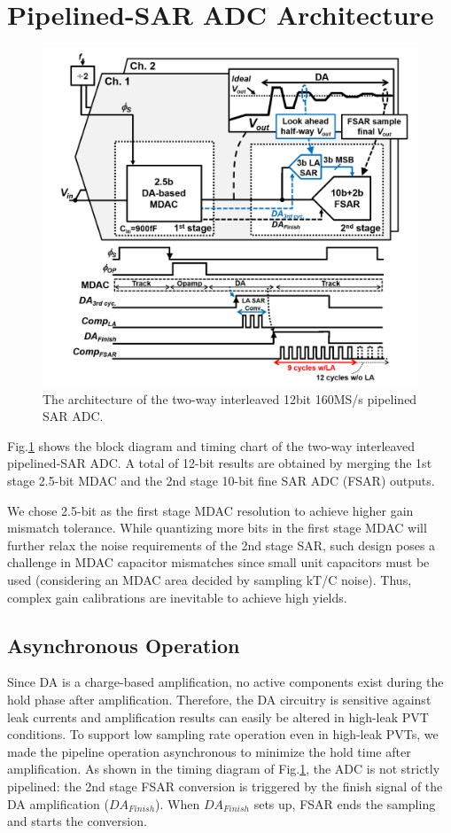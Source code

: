 \section{Pipelined-SAR ADC Architecture}
\begin{figure}[ht!]
\centering
  \includegraphics[width=1\textwidth]{figure/chap2/architecture.png}
  \caption{The architecture of the two-way interleaved 12bit 160MS/s pipelined SAR ADC.}
  \label{fig-overview}
\end{figure}


Fig.\ref{fig-overview} shows the block diagram and timing chart of the two-way interleaved pipelined-SAR ADC. A total of 12-bit results are obtained by merging the 1st stage 2.5-bit MDAC and the 2nd stage 10-bit fine SAR ADC (FSAR) outputs.

We chose 2.5-bit as the first stage MDAC resolution to achieve higher gain mismatch tolerance. While quantizing more bits in the first stage MDAC will further relax the noise requirements of the 2nd stage SAR, such design poses a challenge in MDAC capacitor mismatches since small unit capacitors must be used (considering an MDAC area decided by sampling kT/C noise). Thus, complex gain calibrations are inevitable to achieve high yields. 

\subsection{Asynchronous Operation}
Since DA is a charge-based amplification, no active components exist during the hold phase after amplification. Therefore, the DA circuitry is sensitive against leak currents and amplification results can easily be altered in high-leak PVT conditions. To support low sampling rate operation even in high-leak PVTs, we made the pipeline operation asynchronous to minimize the hold time after amplification. As shown in the timing diagram of Fig.\ref{fig-overview}, the ADC is not strictly pipelined: the 2nd stage FSAR conversion is triggered by the finish signal of the DA amplification ($DA_{Finish}$). When $DA_{Finish}$ sets up, FSAR ends the sampling and starts the conversion. 


